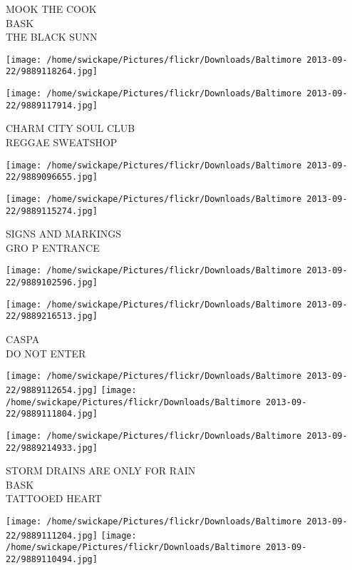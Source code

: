 \documentclass[10pt,letterpaper]{article}
\begin{document}
MOOK THE COOK\\
BASK\\
THE BLACK SUNN\\
\pagebreak

\texttt{[image: /home/swickape/Pictures/flickr/Downloads/Baltimore 2013-09-22/9889118264.jpg]}

\vspace{0.25in}
\texttt{[image: /home/swickape/Pictures/flickr/Downloads/Baltimore 2013-09-22/9889117914.jpg]}

CHARM CITY SOUL CLUB\\
REGGAE SWEATSHOP\\
\pagebreak

\texttt{[image: /home/swickape/Pictures/flickr/Downloads/Baltimore 2013-09-22/9889096655.jpg]}

\vspace{0.25in}
\texttt{[image: /home/swickape/Pictures/flickr/Downloads/Baltimore 2013-09-22/9889115274.jpg]}

SIGNS AND MARKINGS\\
GRO P ENTRANCE\\
\pagebreak

\texttt{[image: /home/swickape/Pictures/flickr/Downloads/Baltimore 2013-09-22/9889102596.jpg]}

\vspace{0.25in}
\texttt{[image: /home/swickape/Pictures/flickr/Downloads/Baltimore 2013-09-22/9889216513.jpg]}

CASPA\\
DO NOT ENTER\\
\pagebreak

\texttt{[image: /home/swickape/Pictures/flickr/Downloads/Baltimore 2013-09-22/9889112654.jpg]}
\texttt{[image: /home/swickape/Pictures/flickr/Downloads/Baltimore 2013-09-22/9889111804.jpg]}

\vspace{0.25in}
\texttt{[image: /home/swickape/Pictures/flickr/Downloads/Baltimore 2013-09-22/9889214933.jpg]}

STORM DRAINS ARE ONLY FOR RAIN\\
BASK\\
TATTOOED HEART\\
\pagebreak

\texttt{[image: /home/swickape/Pictures/flickr/Downloads/Baltimore 2013-09-22/9889111204.jpg]}
\texttt{[image: /home/swickape/Pictures/flickr/Downloads/Baltimore 2013-09-22/9889110494.jpg]}
\end{document}
